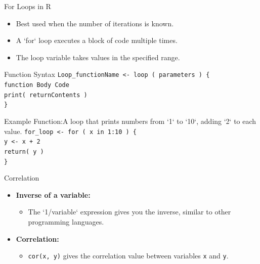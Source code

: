 \documentclass{beamer}
\begin{document}
\begin{frame}{For Loops in R}
    \begin{itemize}
        \item Best used when the number of iterations is known.
        \item A `for` loop executes a block of code multiple times.
        \item The loop variable takes values in the specified range.
    \end{itemize}
        \begin{block}{Function Syntax}
        \texttt{Loop\_functionName <- loop ( parameters ) \{\\
        \quad function Body Code\\
        \quad print( returnContents )\\
        \}}
    \end{block}
        \begin{block}{Example Function:A loop that prints numbers from `1` to `10`, adding `2` to each value.}
        \texttt{for\_loop <- for ( x in 1:10 ) \{\\
        \quad y <- x + 2\\
        \quad return( y )\\
        \}}
    \end{block}

\end{frame}
\begin{frame}{Correlation}
    \begin{itemize}
        \item \textbf{Inverse of a variable:} 
        \begin{itemize}
            \item The `1/variable` expression gives you the inverse, similar to other programming languages.
        \end{itemize}
        
        \item \textbf{Correlation:} 
        \begin{itemize}
            \item \texttt{cor(x, y)} gives the correlation value between variables \texttt{x} and \texttt{y}.
        \end{itemize}
    \end{itemize}
\end{frame}
\end{document}
